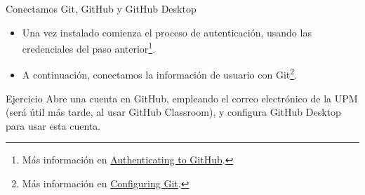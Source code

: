 \documentclass[xcolor={usenames,svgnames,dvipsnames}]{beamer}
\begin{document}
\begin{frame}[label={sec:orgd32c494}]{Conectamos Git, GitHub y GitHub Desktop}
\begin{itemize}
\item Una vez instalado comienza el proceso de autenticación, usando las credenciales del paso anterior\footnote{Más información en \href{https://help.github.com/desktop/guides/getting-started-with-github-desktop/authenticating-to-github/}{Authenticating to GitHub}.}.
\end{itemize}

\begin{center}
\end{center}


\begin{itemize}
\item A continuación, conectamos la información de usuario con Git\footnote{Más información en \href{https://help.github.com/desktop/guides/getting-started-with-github-desktop/configuring-git-for-github-desktop/}{Configuring Git}.}.
\end{itemize}

\begin{center}
\end{center}
\end{frame}

\begin{frame}[label={sec:orgc005986}]{}
\begin{block}{Ejercicio}
Abre una cuenta en GitHub, empleando el correo electrónico de la UPM (será útil más tarde, al usar GitHub Classroom), y configura GitHub Desktop para usar esta cuenta.
\end{block}
\end{frame}
\end{document}
